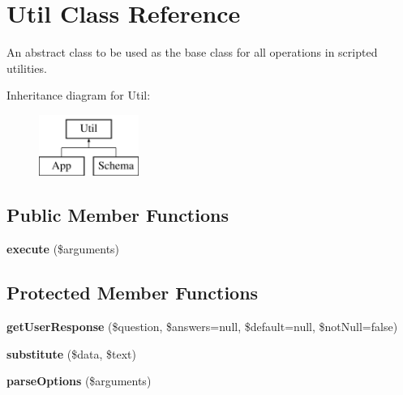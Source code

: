 \hypertarget{class_util}{
\section{Util Class Reference}
\label{class_util}
}


An abstract class to be used as the base class for all operations in scripted utilities.  


Inheritance diagram for Util:\begin{figure}[H]
\begin{center}
\leavevmode
\includegraphics[height=2.000000cm]{class_util}
\end{center}
\end{figure}
\subsection*{Public Member Functions}
\begin{DoxyCompactItemize}
\item 
\hypertarget{class_util_a2923a52d3e614a7c9035d542500b4e8e}{
{\bfseries execute} (\$arguments)}
\label{class_util_a2923a52d3e614a7c9035d542500b4e8e}

\end{DoxyCompactItemize}
\subsection*{Protected Member Functions}
\begin{DoxyCompactItemize}
\item 
\hypertarget{class_util_aab2afb6c8f0099d7c79d17dfe98c1116}{
{\bfseries getUserResponse} (\$question, \$answers=null, \$default=null, \$notNull=false)}
\label{class_util_aab2afb6c8f0099d7c79d17dfe98c1116}

\item 
\hypertarget{class_util_ae05fbdb183a3de093e4f1e2c7a8e24c3}{
{\bfseries substitute} (\$data, \$text)}
\label{class_util_ae05fbdb183a3de093e4f1e2c7a8e24c3}

\item 
\hypertarget{class_util_ae36b2dfb3379b2d5b7fcdc33a694ed18}{
{\bfseries parseOptions} (\$arguments)}
\label{class_util_ae36b2dfb3379b2d5b7fcdc33a694ed18}

\end{DoxyCompactItemize}
